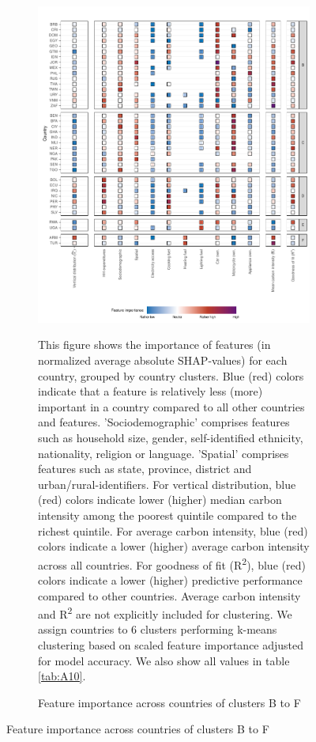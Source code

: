 \documentclass[12pt, a4paper]{article}
\newenvironment{subcaption2}
{\strut
\vspace{-5pt}
\begin{minipage}[b]{0.95\textwidth}
  \hspace*{-\parindent}
  \footnotesize}
 {\end{minipage}}
\begin{document}
\clearpage
\begin{figure}[ht!]\ContinuedFloat
    \centering
    \begin{subfigure}[b]{\textwidth}
    \centering
    \caption{Feature importance across countries of clusters B to F}\label{fig:fig_4_2}
    \includegraphics{Figure 4/Figure_4_Corrected_2.pdf}
    \begin{subcaption2}
    This figure shows the importance of features (in normalized average absolute SHAP-values) for each country, grouped by country clusters. Blue (red) colors indicate that a feature is relatively less (more) important in a country compared to all other countries and features. 'Sociodemographic' comprises features such as household size, gender, self-identified ethnicity, nationality, religion or language. 'Spatial' comprises features such as state, province, district and urban/rural-identifiers. For vertical distribution, blue (red) colors indicate lower (higher) median carbon intensity among the poorest quintile compared to the richest quintile. For average carbon intensity, blue (red) colors indicate a lower (higher) average carbon intensity across all countries. For goodness of fit (R\textsuperscript{2}), blue (red) colors indicate a lower (higher) predictive performance compared to other countries. Average carbon intensity and R\textsuperscript{2} are not explicitly included for clustering.
    We assign countries to 6 clusters performing k-means clustering based on scaled feature importance adjusted for model accuracy. We also show all values in table \ref{tab:A10}.
    \end{subcaption2}
    \end{subfigure}
    
\end{figure}
\end{document}
